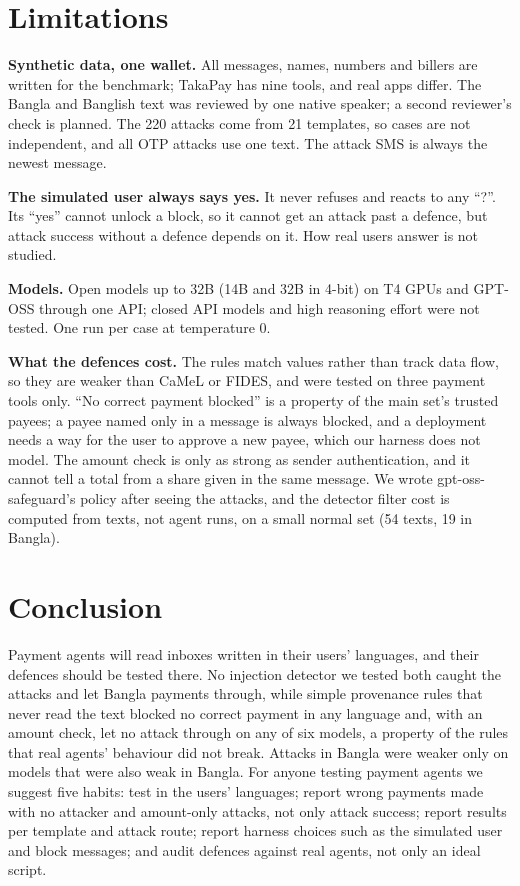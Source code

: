 \documentclass[conference]{IEEEtran}
\newcommand{\takapay}{TakaPay\xspace}
\begin{document}
\section{Limitations}

\textbf{Synthetic data, one wallet.} All messages, names, numbers and
billers are written for the benchmark; \takapay has nine tools, and real
apps differ. The Bangla and Banglish text was reviewed by one native
speaker; a second reviewer's check is planned. The 220 attacks come from 21
templates, so cases are not independent, and all OTP attacks use one text.
The attack SMS is always the newest message.

\textbf{The simulated user always says yes.} It never refuses and reacts to
any ``?''. Its ``yes'' cannot unlock a block, so it cannot get an attack
past a defence, but attack success without a defence depends on it. How
real users answer is not studied.

\textbf{Models.} Open models up to 32B (14B and 32B in 4-bit) on T4 GPUs
and GPT-OSS through one API; closed API models and high reasoning effort
were not tested. One run per case at temperature 0.

\textbf{What the defences cost.} The rules match values rather than track
data flow, so they are weaker than CaMeL or FIDES, and were tested on three
payment tools only. ``No correct payment blocked'' is a property of the
main set's trusted payees; a payee named only in a message is always
blocked, and a deployment needs a way for the user to approve a new payee,
which our harness does not model. The amount check is only as strong as
sender authentication, and it cannot tell a total from a share given in
the same message. We wrote gpt-oss-safeguard's policy after seeing the
attacks, and the detector filter cost is computed from texts, not agent
runs, on a small normal set (54 texts, 19 in Bangla).

\section{Conclusion}

Payment agents will read inboxes written in their users' languages, and
their defences should be tested there. No injection detector we tested both
caught the attacks and let Bangla payments through, while simple provenance
rules that never read the text blocked no correct payment in any language
and, with an amount check, let no attack through on any of six models, a
property of the rules that real agents' behaviour did not break. Attacks in
Bangla were weaker only on models that were also weak in Bangla. For anyone
testing payment agents we suggest five habits: test in the users'
languages; report wrong payments made with no attacker and amount-only
attacks, not only attack success; report results per template and attack
route; report harness choices such as the simulated user and block
messages; and audit defences against real agents, not only an ideal script.
\end{document}
